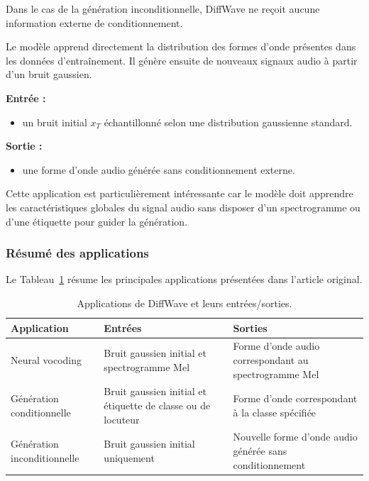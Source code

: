 Dans le cas de la génération inconditionnelle, DiffWave ne reçoit
aucune information externe de conditionnement.

Le modèle apprend directement la distribution des formes d'onde
présentes dans les données d'entraînement. Il génère ensuite
de nouveaux signaux audio à partir d'un bruit gaussien.

\textbf{Entrée :}
\begin{itemize}
    \item un bruit initial $x_T$ échantillonné selon une
    distribution gaussienne standard.
\end{itemize}

\textbf{Sortie :}
\begin{itemize}
    \item une forme d'onde audio générée sans conditionnement
    externe.
\end{itemize}

Cette application est particulièrement intéressante car le
modèle doit apprendre les caractéristiques globales du signal
audio sans disposer d'un spectrogramme ou d'une étiquette
pour guider la génération.

\subsubsection{Résumé des applications}

Le Tableau~\ref{tab:diffwave_applications} résume les principales
applications présentées dans l'article original.

\begin{table}[htbp]
    \centering
    \caption{Applications de DiffWave et leurs entrées/sorties.}
    \label{tab:diffwave_applications}
    \begin{tabular}{|p{3.2cm}|p{5cm}|p{5cm}|}
        \hline
        \textbf{Application} &
        \textbf{Entrées} &
        \textbf{Sorties} \\
        \hline
        Neural vocoding &
        Bruit gaussien initial et spectrogramme Mel &
        Forme d'onde audio correspondant au spectrogramme Mel \\
        \hline
        Génération conditionnelle &
        Bruit gaussien initial et étiquette de classe ou de locuteur &
        Forme d'onde correspondant à la classe spécifiée \\
        \hline
        Génération inconditionnelle &
        Bruit gaussien initial uniquement &
        Nouvelle forme d'onde audio générée sans conditionnement \\
        \hline
    \end{tabular}
\end{table}

